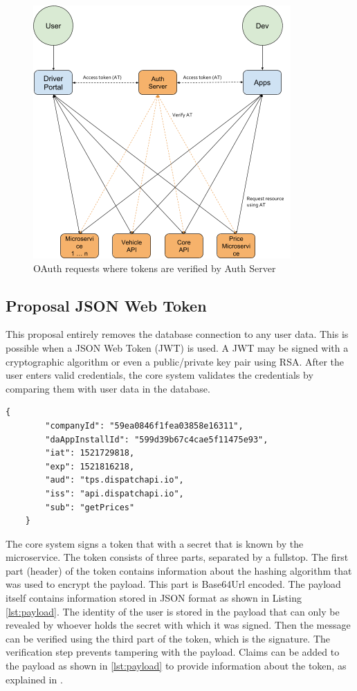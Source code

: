 \begin{figure}[H]
	\centering
	\includegraphics[width=.7\textwidth]{Auth1}
	\caption[OAuth 2.0]{OAuth requests where tokens are verified by Auth Server}
	\label{fig:Auth1}
\end{figure}

\subsection{Proposal JSON Web Token}
This proposal entirely removes the database connection to any user data. This is possible when a JSON Web Token (JWT) is used. A JWT may be signed with a cryptographic algorithm or even a public/private key pair using RSA. After the user enters valid credentials, the core system validates the credentials by comparing them with user data in the database.

\begin{lstlisting}[caption={Two user identifiers and registered claim names stored inside the payload of a JSON web token.}, label={lst:payload}]
	{
		"companyId": "59ea0846f1fea03858e16311",
		"daAppInstallId": "599d39b67c4cae5f11475e93",
		"iat": 1521729818,
		"exp": 1521816218,
		"aud": "tps.dispatchapi.io",
		"iss": "api.dispatchapi.io",
		"sub": "getPrices"
	}
\end{lstlisting}

The core system signs a token that with a secret that is known by the microservice. The token consists of three parts, separated by a fullstop. The first part (header) of the token contains information about the hashing algorithm that was used to encrypt the payload. This part is Base64Url encoded. The payload itself contains information stored in JSON format as shown in Listing \ref{lst:payload}. The identity of the user is stored in the payload that can only be revealed by whoever holds the secret with which it was signed. Then the message can be verified using the third part of the token, which is the signature. The verification step prevents tampering with the payload. Claims can be added to the payload as shown in \ref{lst:payload} to provide information about the token, as explained in \cite{JWT}.

